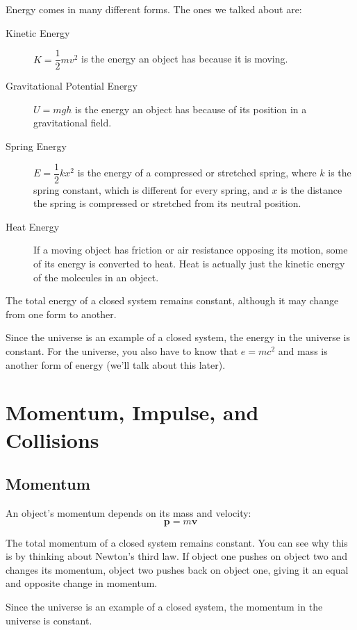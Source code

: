 \documentclass{exam}
\begin{document}
Energy comes in many different forms.  The ones we talked about are:
\begin{description}

\item[Kinetic Energy] $K = \dfrac{1}{2} mv^2$ is the energy an object has because it is moving.

\item[Gravitational Potential Energy] $U = mgh$ is the energy an object has because of its position in a gravitational
  field.

\item[Spring Energy] $E = \dfrac{1}{2} kx^2$ is the energy of a compressed or stretched spring, where $k$ is the spring
constant, which is different for every spring, and $x$ is the distance the spring is compressed or stretched from its
neutral position.

\item[Heat Energy] If a moving object has friction or air resistance opposing its motion, some of its energy is
  converted to heat.  Heat is actually just the kinetic energy of the molecules in an object.

\end{description}

The total energy of a closed system remains constant, although it may change from one form to another.  

Since the universe is an example of a closed system, the energy in the universe is constant.  For the universe, you also
have to know that $e = mc^2$ and mass is another form of energy (we'll talk about this later). 

\section{Momentum, Impulse, and Collisions}

\subsection{Momentum}
An object's momentum depends on its mass and velocity: 
\[
\mathbf{p} = m \mathbf{v}
\]

The total momentum of a closed system remains constant.  You can see why this is by thinking about Newton's third law.
If object one pushes on object two and changes its momentum, object two pushes back on object one, giving it an equal
and opposite change in momentum.

Since the universe is an example of a closed system, the momentum in the universe is constant.
\end{document}
